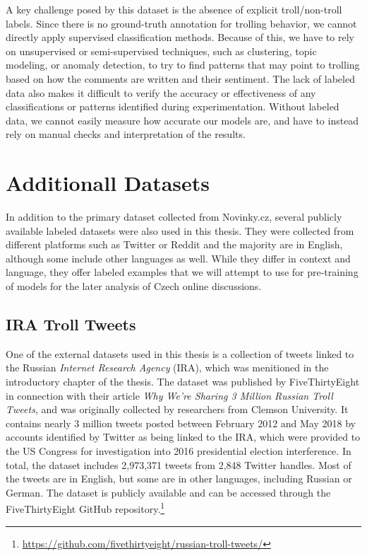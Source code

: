 \documentclass[twoside]{ctuthesis}
\theoremstyle{plain}
\theoremstyle{definition}
\theoremstyle{note}
\begin{document}
A key challenge posed by this dataset is the absence of explicit troll/non-troll labels. Since there is no ground-truth annotation for trolling behavior, we cannot directly apply supervised classification methods. Because of this, we have to rely on unsupervised or semi-supervised techniques, such as clustering, topic modeling, or anomaly detection, to try to find patterns that may point to trolling based on how the comments are written and their sentiment. The lack of labeled data also makes it difficult to verify the accuracy or effectiveness of any classifications or patterns identified during experimentation. Without labeled data, we cannot easily measure how accurate our models are, and have to instead rely on manual checks and interpretation of the results.\par

\section{Additionall Datasets}

In addition to the primary dataset collected from Novinky.cz, several publicly available labeled datasets were also used in this thesis. They were collected from different platforms such as Twitter or Reddit and the majority are in English, although some include other languages as well. While they differ in context and language, they offer labeled examples that we will attempt to use for pre-training of models for the later analysis of Czech online discussions.\par

\subsection{IRA Troll Tweets}
One of the external datasets used in this thesis is a collection of tweets linked to the Russian \textit{Internet Research Agency} (IRA), which was menitioned in the introductory chapter of the thesis. The dataset was published by FiveThirtyEight in connection with their article \textit{Why We're Sharing 3 Million Russian Troll Tweets}, and was originally collected by researchers from Clemson University. It contains nearly 3 million tweets posted between February 2012 and May 2018 by accounts identified by Twitter as being linked to the IRA, which were provided to the US Congress for investigation into 2016 presidential election interference. In total, the dataset includes 2,973,371 tweets from 2,848 Twitter handles. Most of the tweets are in English, but some are in other languages, including Russian or German. The dataset is publicly available and can be accessed through the FiveThirtyEight GitHub repository.\footnote{\url{https://github.com/fivethirtyeight/russian-troll-tweets/}}
\end{document}

